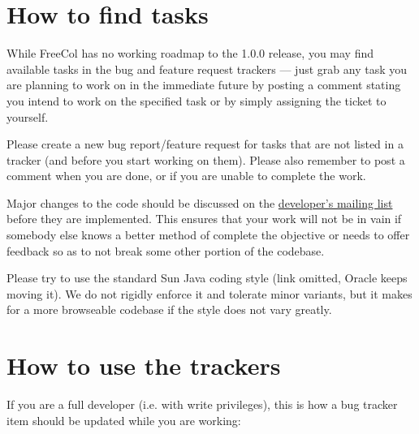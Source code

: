 \documentclass[12pt]{book}
\begin{document}
\hypertarget{How to find tasks}{\section{How to find tasks}}

While FreeCol has no working roadmap to the 1.0.0 release, you may find
available tasks in the bug and feature request trackers --- just grab any
task you are planning to work on in the immediate future by posting a
comment stating you intend to work on the specified task or by simply
assigning the ticket to yourself.

Please create a new bug report/feature request for tasks that are not
listed in a tracker (and before you start working on them). Please
also remember to post a comment when you are done, or if you are unable
to complete the work.

Major changes to the code should be discussed on the
\href{https://sourceforge.net/p/freecol/mailman/freecol-developers/\#freecol-developers mailing list}{developer's
mailing list} before they are implemented. This ensures that your work will
not be in vain if somebody else knows a better method of complete the
objective or needs to offer feedback so as to not break some other portion
of the codebase.

Please try to use the standard Sun Java coding style (link omitted, Oracle
keeps moving it).  We do not rigidly enforce it and tolerate minor
variants, but it makes for a more browseable codebase if the style
does not vary greatly.

\hypertarget{How to use the trackers}{\section{How to use the trackers}}

If you are a full developer (i.e. with write privileges), this is how
a bug tracker item should be updated while you are working:
\end{document}
